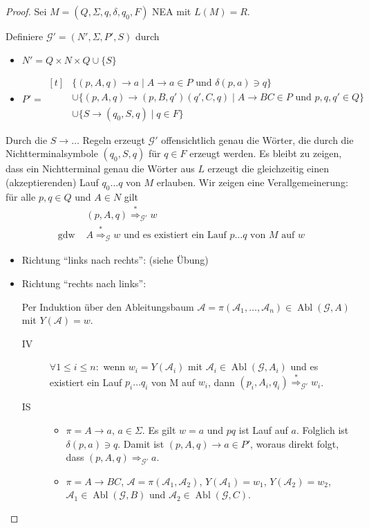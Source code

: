 {\begin{proof}
  Sei $M = (Q, \Sigma, q, \delta, q_0, F)$ NEA mit $L(M) = R$.

  Definiere $\mathcal{G}' = (N', \Sigma, P', S)$ durch
  \begin{itemize}
  \item[] $N' = Q \times N \times Q \cup \{S\}$
  \item[] $P' =
    \begin{aligned}[t]
      &\{ (p, A, q) \to a \mid A \to a \in P \text{ und } \delta(p,a) \ni q \} \\
      &\cup \{ (p, A, q) \to (p,B,q')(q',C,q) \mid A \to BC \in P \text{ und } p,q,q' \in Q\} \\
      &\cup \{ S \to (q_0, S, q) \mid q \in F \}
    \end{aligned}
    $
  \end{itemize}
  Durch die $S \to \ldots$ Regeln erzeugt $\mathcal{G}'$ offensichtlich genau die Wörter, die durch die Nichtterminalsymbole $(q_0, S, q)$ für $q \in F$ erzeugt werden.
  Es bleibt zu zeigen, dass ein Nichtterminal genau die Wörter aus $L$ erzeugt die gleichzeitig einen (akzeptierenden) Lauf $q_0\ldots q$ von $M$ erlauben.
  Wir zeigen eine Verallgemeinerung: für alle $p,q \in Q$ und $A \in N$ gilt
  \begin{align*}
    &(p,A,q) \stackrel{*}{\Longrightarrow}_{\mathcal{G}'} w \\
    \text{ gdw } & A \stackrel{*}{\Longrightarrow}_{\mathcal{G}} w \text{ und es existiert ein Lauf } p\ldots q \text{ von $M$ auf $w$}
  \end{align*}
  \begin{itemize}
  \item Richtung "`links nach rechts"': (siehe Übung)
  \item Richtung "`rechts nach links"':

    Per Induktion über den Ableitungsbaum $\mathcal{A} = \pi(\mathcal{A}_1,\ldots,\mathcal{A}_n) \in \operatorname{Abl}(\mathcal{G}, A)$ mit $Y(\mathcal{A}) = w$.
    \begin{description}
      \item[IV] $\forall 1 \le i \le n:$ wenn $w_i = Y(\mathcal{A}_i)$ mit $\mathcal{A}_i \in \operatorname{Abl}(\mathcal{G}, A_i)$ und es existiert ein Lauf  $p_i\ldots q_i$  von M auf $w_i$, dann $(p_i, A_i, q_i) \stackrel{*}{\Longrightarrow}_{\mathcal{G}'} w_i$.
      \item[IS] \hfill
        \begin{itemize}
        \item $\pi = A \to a$, $a \in \Sigma$.
          Es gilt $w = a$ und $pq$ ist Lauf auf $a$.
          Folglich ist $\delta(p, a) \ni q$. Damit ist $(p,A,q) \to a \in P'$, woraus direkt folgt, dass $(p,A,q) \Longrightarrow_{\mathcal{G}'} a$.
        \item $\pi = A \to BC$, $\mathcal{A} = \pi(\mathcal{A}_1, \mathcal{A}_2)$, $Y(\mathcal{A}_1) = w_1$, $Y(\mathcal{A}_2) = w_2$, \mbox{$\mathcal{A}_1 \in \operatorname{Abl}(\mathcal{G}, B)$} und $\mathcal{A}_2 \in \operatorname{Abl}(\mathcal{G}, C)$.


\end{itemize}
\end{description}
\end{itemize}
\end{proof}}
